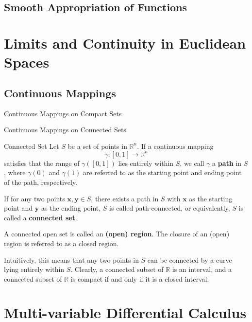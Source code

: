 \documentclass[11pt]{../../TexTemplate/elegantbook}
\begin{document}
\section{Smooth Appropriation of Functions}

\chapter{Limits and Continuity in Euclidean Spaces}

\section{Continuous Mappings}
\begin{leftbarTitle}{Continuous Mappings on Compact Sets}\end{leftbarTitle}

\begin{leftbarTitle}{Continuous Mappings on Connected Sets}\end{leftbarTitle}
\begin{definition}{Connected Set}
    Let \(S\) be a set of points in \(\mathbb{R}^n\). 
    If a continuous mapping 
    \[
        \gamma: [0, 1] \to \mathbb{R}^n
    \]
    satisfies that the range of \(\gamma([0, 1])\) lies entirely within \(S\), 
    we call \(\gamma\) a \textbf{path} in \(S\), 
    where \(\gamma(0)\) and \(\gamma(1)\) are referred to as the starting point and ending point of the path, respectively.  
    
    If for any two points \(\mathbf{x}, \mathbf{y} \in S\), 
    there exists a path in \(S\) with \(\mathbf{x}\) as the starting point and \(\mathbf{y}\) as the ending point, 
    \(S\) is called path-connected, or equivalently, \(S\) is called a \textbf{connected set}.  
    
    A connected open set is called an \textbf{(open) region}. The closure of an (open) region is referred to as a closed region.
\end{definition}

\begin{remark}
    Intuitively, this means that any two points in \(S\) can be connected 
    by a curve lying entirely within \(S\). 
    Clearly, a connected subset of \(\mathbb{R}\) is an interval, 
    and a connected subset of \(\mathbb{R}\) is compact if and only if it is a closed interval.
\end{remark}



\chapter{Multi-variable Differential Calculus}
\end{document}
